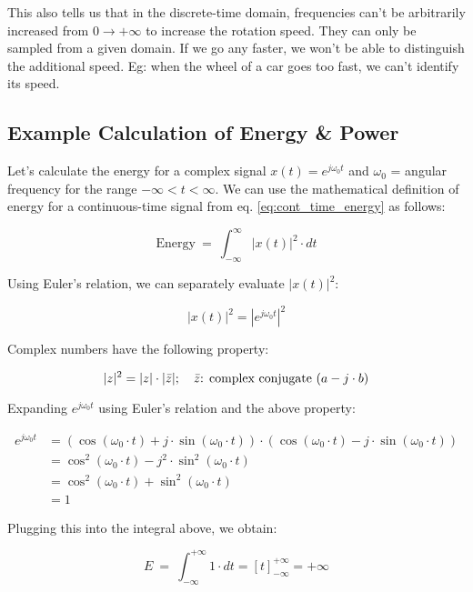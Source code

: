 \documentclass[letterpaper,12pt]{article}
\begin{document}
This also tells us that in the discrete-time domain, frequencies can't be
arbitrarily increased from $0 \to +\infty$ to increase the rotation speed. They
can only be sampled from a given domain. If we go any faster, we won't be able
to distinguish the additional speed. Eg: when the wheel of a car goes too fast,
we can't identify its speed.

\subsection{Example Calculation of Energy \& Power}
Let's calculate the energy for a complex signal $x(t) = e^{j{\omega_0}t}$ and
$\omega_0$ = angular frequency for the range $-\infty < t < \infty$. We can use
the mathematical definition of energy for a continuous-time signal from eq.
\ref{eq:cont_time_energy} as follows:

\[\text{Energy}\ =\ \int_{-\infty}^{\infty}\left|x\left(t\right)\right|^{2}\cdot dt\]

Using Euler's relation, we can separately evaluate $|x(t)|^2$:

\[|x(t)|^{2}=|e^{j\omega_{0}t}|^{2}\]

Complex numbers have the following property:

\[|z|^2=|z|\cdot|\Bar{z}|; \quad \Bar{z}\text{: complex conjugate } (a-j\cdot b)\]

Expanding $e^{j\omega_{0}t}$ using Euler's relation and the above property:

\begin{equation*}
    \begin{aligned}
        e^{j\omega_{0}t} & = (\cos(\omega_0 \cdot t) + j\cdot \sin(\omega_0 \cdot t)) \cdot (\cos(\omega_0 \cdot t) - j\cdot \sin(\omega_0 \cdot t)) \\
                         & = \cos^2(\omega_0 \cdot t) - j^2\cdot \sin^2(\omega_0 \cdot t)                                                            \\
                         & = \cos^2(\omega_0 \cdot t) + \sin^2(\omega_0 \cdot t)                                                                     \\
                         & = 1
    \end{aligned}
\end{equation*}

Plugging this into the integral above, we obtain:

\[E\ =\ \int_{-\infty}^{+\infty}1\cdot dt=\left[t\right]_{-\infty}^{+\infty}=+\infty\]
\end{document}
